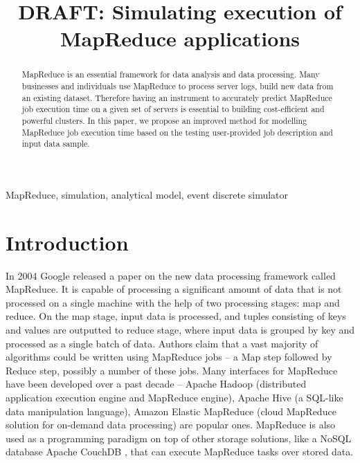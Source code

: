 \documentclass[conference]{IEEEtran} \IEEEoverridecommandlockouts
\begin{document}
 
    
    \title{DRAFT: Simulating execution of MapReduce applications}

    \author{ 
    }

    \maketitle

    \begin{abstract} 

    MapReduce is an essential framework for data analysis and data processing.
    Many businesses and individuals use MapReduce to process server logs,
    build new data from an existing dataset. Therefore having an instrument
    to accurately predict MapReduce job execution time on a given set of
    servers is essential to building cost-efficient and powerful clusters.
    In this paper, we propose an improved method for modelling MapReduce
    job execution time based on the testing user-provided job description
    and input data sample. 


    \end{abstract}

    \begin{IEEEkeywords} 
        MapReduce, simulation, analytical model, event discrete simulator
    \end{IEEEkeywords}

    \section{Introduction}
    In 2004 Google released a paper \cite{google_mapreduce} on the new data
    processing framework called MapReduce. It is capable of processing a
    significant amount of data that is not processed on a single machine with
    the help of two processing stages: map and reduce. On the map stage, input
    data is processed, and tuples consisting of keys and values are outputted
    to reduce stage, where input data is grouped by key and processed as a
    single batch of data. Authors claim that a vast majority of algorithms
    could be written using MapReduce jobs -- a Map step followed by Reduce
    step, possibly a number of these jobs. Many interfaces for MapReduce have
    been developed over a past decade -- Apache Hadoop \cite{apache_hadoop}
    (distributed application execution engine and MapReduce engine), Apache
    Hive \cite{apache_hive} (a SQL-like data manipulation language), Amazon
    Elastic MapReduce \cite{amazon_emr} (cloud MapReduce solution for on-demand
    data processing) are popular ones. MapReduce is also used as a programming
    paradigm on top of other storage solutions, like a NoSQL database Apache
    CouchDB \cite{apache_couchdb}, that can execute MapReduce tasks over stored
    data.
\end{document}
